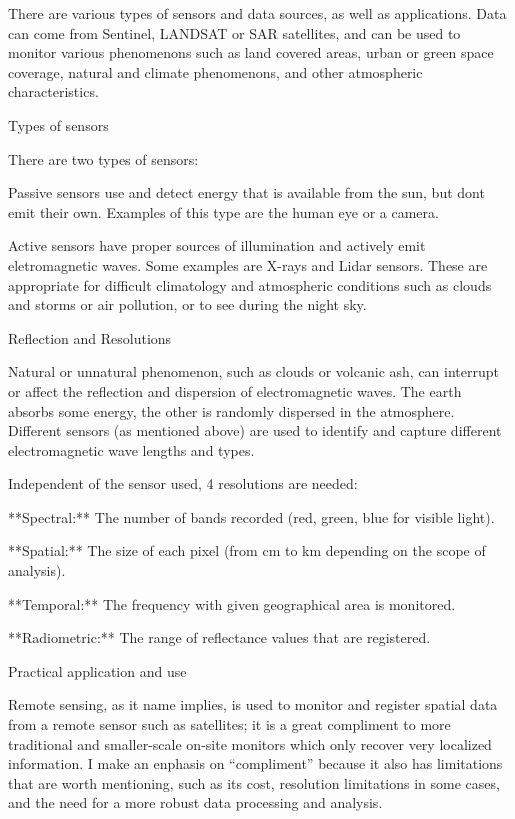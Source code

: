 \documentclass[
  letterpaper,
  DIV=11,
  numbers=noendperiod]{scrreprt}
\begin{document}
There are various types of sensors and data sources, as well as
applications. Data can come from Sentinel, LANDSAT or SAR satellites,
and can be used to monitor various phenomenons such as land covered
areas, urban or green space coverage, natural and climate phenomenons,
and other atmospheric characteristics.

Types of sensors

There are two types of sensors:

Passive sensors use and detect energy that is available from the sun,
but dont emit their own. Examples of this type are the human eye or a
camera.

Active sensors have proper sources of illumination and actively emit
eletromagnetic waves. Some examples are X-rays and Lidar sensors. These
are appropriate for difficult climatology and atmospheric conditions
such as clouds and storms or air pollution, or to see during the night
sky.

Reflection and Resolutions

Natural or unnatural phenomenon, such as clouds or volcanic ash, can
interrupt or affect the reflection and dispersion of electromagnetic
waves. The earth absorbs some energy, the other is randomly dispersed in
the atmosphere. Different sensors (as mentioned above) are used to
identify and capture different electromagnetic wave lengths and types.

Independent of the sensor used, 4 resolutions are needed:

**Spectral:** The number of bands recorded (red, green, blue for visible
light).

**Spatial:** The size of each pixel (from cm to km depending on the
scope of analysis).

**Temporal:** The frequency with given geographical area is monitored.

**Radiometric:** The range of reflectance values that are registered.

Practical application and use

Remote sensing, as it name implies, is used to monitor and register
spatial data from a remote sensor such as satellites; it is a great
compliment to more traditional and smaller-scale on-site monitors which
only recover very localized information. I make an enphasis on
``compliment'' because it also has limitations that are worth
mentioning, such as its cost, resolution limitations in some cases, and
the need for a more robust data processing and analysis.
\end{document}
